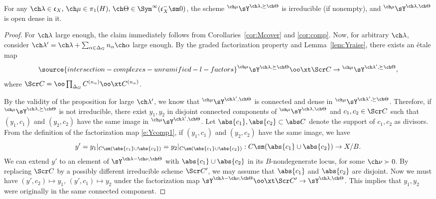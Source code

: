 \begin{cor}
\notready \label{cor:Ycomp}
For any $\ch\lambda \in \mathfrak c_X,\, \ch\mu\in \pi_1(H),\,
\ch\Theta \in \Sym^\infty(\mathfrak c_X^- \sm 0)$, the scheme
$^{\ch\mu}\sY^{\ch\lambda,\succeq\ch\Theta}$ is irreducible (if nonempty), and $^{\ch\mu}\sY^{\ch\lambda,\ch\Theta} $ is open dense in it.
\end{cor}
\begin{proof}
For $\ch\lambda$ large enough, the claim immediately follows from
Corollaries~\ref{cor:Mcover} and \ref{cor:comp}.
Now, for arbitrary $\ch\lambda$, consider
$\ch\lambda'=\ch\lambda+\sum_{\alpha\in \Delta_G} n_\alpha \ch\alpha$
large enough.
By the graded factorization property and Lemma~\ref{lem:Yraise},
there exists an \'etale map
\begin{equation} \label{e:Ycomp1}
\source{intersection-complexes-unramified-l-factors}
    ^{\ch\mu}\sY^{\ch\lambda,\succeq\ch\Theta} \oo\xt \Scr C \to {^{\ch\mu}}\sY^{\ch\lambda',\succeq\ch\Theta},
 \end{equation}
where $\Scr C = \oo\prod_{\Delta_G} C^{(n_\alpha)} \oo\xt C^{(n_\alpha)}$.


By the validity of the proposition for large $\ch\lambda'$,
we know that $^{\ch\mu}\sY^{\ch\lambda',\ch\Theta}$ is
connected and dense in $^{\ch\mu}\sY^{\ch\lambda', \succeq \ch\Theta}$.
Therefore, if $^{\ch\mu}\sY^{\ch\lambda,\succeq\ch\Theta}$ is not irreducible,
there exist $y_1,y_2$ in disjoint connected components of
$^{\ch\mu}\sY^{\ch\lambda,\ch\Theta}$
and $c_1,c_2\in \Scr C$ such that $(y_1,c_1)$ and $(y_2,c_2)$ have the same
image in $^{\ch\mu}\sY^{\ch\lambda',\ch\Theta}$.
Let $\abs{c_1}, \abs{c_2} \subset \abs C$ denote the support of $c_1,c_2$
as divisors.
From the definition of the factorization map \eqref{e:Ycomp1},
if $(y_1,c_1)$ and $(y_2,c_2)$ have the same image,
we have
\[ y' = y_1 |_{C \sm (\abs{c_1}\cup \abs{c_2})} = y_2 |_{C\sm (\abs{c_1}\cup \abs{c_2})} : C \sm (\abs{c_1}\cup \abs{c_2}) \to X/B. \]
We can extend $y'$ to an element of $\sY^{\ch\lambda-\ch\nu, \ch\Theta}$
with $\abs{c_1}\cup \abs{c_2}$ in its $B$-nondegenerate locus,
for some $\ch\nu\succ 0$.
By replacing $\Scr C$ by a possibly different irreducible scheme $\Scr C'$,
we may assume that $\abs{c_1}$ and $\abs{c_2}$ are disjoint.
Now we must have $(y', c_2) \mapsto y_1,\, (y',c_1)\mapsto y_2$ under
the factorization map
$\sY^{\ch\lambda-\ch\nu,\ch\Theta} \oo\xt \Scr C' \to \sY^{\ch\lambda,\ch\Theta}$.
This implies that $y_1,y_2$ were originally in the same connected component.
\end{proof}



